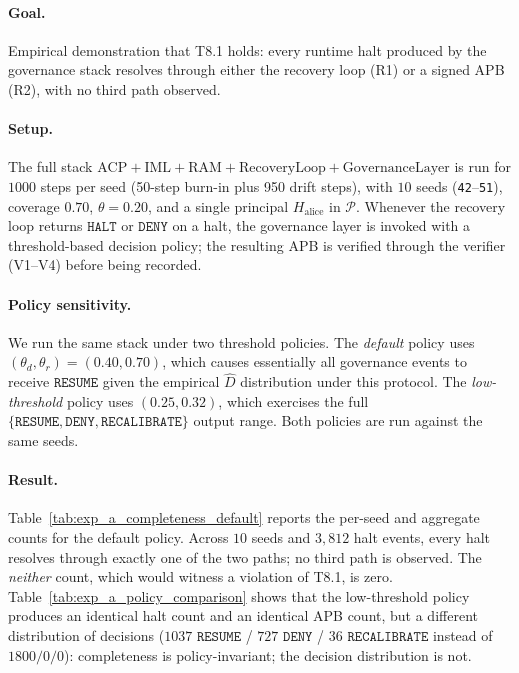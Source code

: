 \documentclass[11pt]{article}
\newcommand{\Dhat}{\widehat{D}}
\newcommand{\HALT}{\texttt{HALT}}
\newcommand{\RESUME}{\texttt{RESUME}}
\newcommand{\DENY}{\texttt{DENY}}
\newcommand{\RECAL}{\texttt{RECALIBRATE}}
\newcommand{\Pset}{\mathcal{P}}
\begin{document}
\paragraph{Goal.} Empirical demonstration that T8.1 holds: every
runtime halt produced by the governance stack resolves through either
the recovery loop (R1) or a signed APB (R2), with no third path
observed.

\paragraph{Setup.} The full stack
$\text{ACP} + \text{IML} + \text{RAM} + \text{RecoveryLoop} +
\text{GovernanceLayer}$ is run for $1000$ steps per seed (50-step
burn-in plus 950 drift steps), with $10$ seeds (\texttt{42}--\texttt{51}),
coverage $0.70$, $\theta = 0.20$, and a single principal
$H_{\mathrm{alice}}$ in $\Pset$. Whenever the recovery loop returns
$\HALT$ or $\DENY$ on a halt, the governance layer is invoked with a
threshold-based decision policy; the resulting APB is verified
through the verifier (V1--V4) before being recorded.

\paragraph{Policy sensitivity.} We run the same stack under two
threshold policies. The \emph{default} policy uses
$(\theta_d, \theta_r) = (0.40, 0.70)$, which causes essentially all
governance events to receive $\RESUME$ given the empirical $\Dhat$
distribution under this protocol. The \emph{low-threshold} policy
uses $(0.25, 0.32)$, which exercises the full
$\{\RESUME, \DENY, \RECAL\}$ output range. Both policies are run
against the same seeds.

\paragraph{Result.} Table~\ref{tab:exp_a_completeness_default}
reports the per-seed and aggregate counts for the default policy.
Across $10$ seeds and $3{,}812$ halt events, every halt resolves through
exactly one of the two paths; no third path is observed. The
\emph{neither} count, which would witness a violation of T8.1, is
zero. Table~\ref{tab:exp_a_policy_comparison} shows that the
low-threshold policy produces an identical halt count and an identical
APB count, but a different distribution of decisions
($1037$ $\RESUME$ / $727$ $\DENY$ / $36$ $\RECAL$ instead of
$1800 / 0 / 0$): completeness is policy-invariant; the decision
distribution is not.
\end{document}
